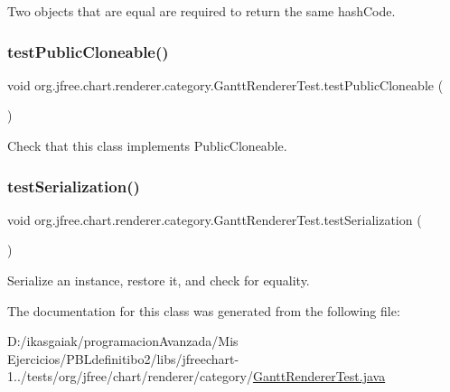Two objects that are equal are required to return the same hash\+Code. \mbox{\label{classorg_1_1jfree_1_1chart_1_1renderer_1_1category_1_1_gantt_renderer_test_a4f9a411176fb90da63ddf929706eb378}} 
\subsubsection{\texorpdfstring{test\+Public\+Cloneable()}{testPublicCloneable()}}
{\footnotesize\ttfamily void org.\+jfree.\+chart.\+renderer.\+category.\+Gantt\+Renderer\+Test.\+test\+Public\+Cloneable (\begin{DoxyParamCaption}{ }\end{DoxyParamCaption})}

Check that this class implements Public\+Cloneable. \mbox{\label{classorg_1_1jfree_1_1chart_1_1renderer_1_1category_1_1_gantt_renderer_test_a14e5d5074cc429ad0837abda33e6044b}} 
\subsubsection{\texorpdfstring{test\+Serialization()}{testSerialization()}}
{\footnotesize\ttfamily void org.\+jfree.\+chart.\+renderer.\+category.\+Gantt\+Renderer\+Test.\+test\+Serialization (\begin{DoxyParamCaption}{ }\end{DoxyParamCaption})}

Serialize an instance, restore it, and check for equality. 

The documentation for this class was generated from the following file\+:\begin{DoxyCompactItemize}
\item 
D\+:/ikasgaiak/programacion\+Avanzada/\+Mis Ejercicios/\+P\+B\+Ldefinitibo2/libs/jfreechart-\/1../tests/org/jfree/chart/renderer/category/\mbox{\hyperlink{_gantt_renderer_test_8java}{Gantt\+Renderer\+Test.\+java}}\end{DoxyCompactItemize}
